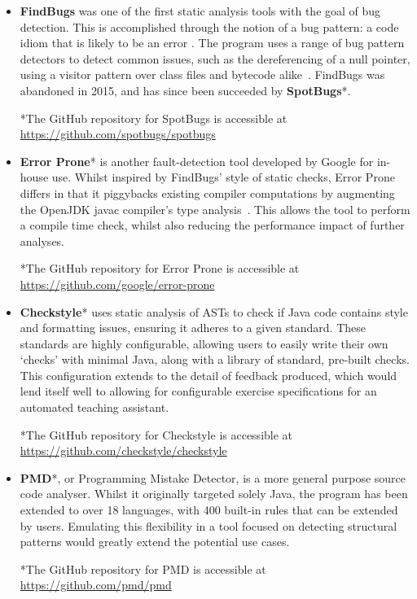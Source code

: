 \begin{itemize}
    \item \textbf{FindBugs} was one of the first static analysis tools with the goal of bug detection. This is accomplished through the notion of a bug pattern: a code idiom that is likely to be an error \cite{FindingBugsIsEasy}. The program uses a range of bug pattern detectors to detect common issues, such as the dereferencing of a null pointer, using a visitor pattern over class files and bytecode alike~\cite{UsingFindBugs}. FindBugs was abandoned in 2015, and has since been succeeded by \textbf{SpotBugs}*. 

    \footnotesize
    *The GitHub repository for SpotBugs is accessible at \url{https://github.com/spotbugs/spotbugs}
    \normalsize 
 
    \item \textbf{Error Prone}* is another fault-detection tool developed by Google for in-house use. Whilst inspired by FindBugs' style of static checks, Error Prone
    differs in that it piggybacks existing compiler computations by augmenting the OpenJDK javac compiler's type analysis~\cite{ErrorProne}. This allows the tool to perform a compile time check, whilst also reducing the performance impact of further analyses.

    \footnotesize
     *The GitHub repository for Error Prone is accessible at \url{https://github.com/google/error-prone}
    \normalsize

    \item \textbf{Checkstyle}* uses static analysis of ASTs to check if Java code contains style and formatting issues, ensuring it adheres to a given standard. These standards are highly configurable, allowing users to easily write their own `checks' with minimal Java, along with a library of standard, pre-built checks. This configuration extends to the detail of feedback produced, which would lend itself well to allowing for configurable exercise specifications for an automated teaching assistant.

    \footnotesize{*The GitHub repository for Checkstyle is accessible at \url{https://github.com/checkstyle/checkstyle}}
    \normalsize 

    \item \textbf{PMD}*, or Programming Mistake Detector, is a more general purpose source code analyser. Whilst it originally targeted solely Java, the program has been extended to over 18 languages, with 400 built-in rules that can be extended by users. Emulating this flexibility in a tool focused on detecting structural patterns would greatly extend the potential use cases.
    
    \footnotesize
    *The GitHub repository for PMD is accessible at \url{https://github.com/pmd/pmd}
    \normalsize
\end{itemize}

